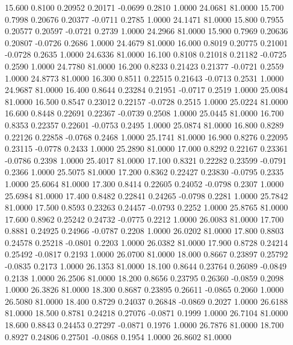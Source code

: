   15.600   0.8100   0.20952   0.20171  -0.0699   0.2810   1.0000  24.0681  81.0000
  15.700   0.7998   0.20676   0.20377  -0.0711   0.2785   1.0000  24.1471  81.0000
  15.800   0.7955   0.20577   0.20597  -0.0721   0.2739   1.0000  24.2966  81.0000
  15.900   0.7969   0.20636   0.20807  -0.0726   0.2686   1.0000  24.4679  81.0000
  16.000   0.8019   0.20775   0.21001  -0.0728   0.2635   1.0000  24.6336  81.0000
  16.100   0.8108   0.21018   0.21182  -0.0725   0.2590   1.0000  24.7780  81.0000
  16.200   0.8233   0.21423   0.21377  -0.0721   0.2559   1.0000  24.8773  81.0000
  16.300   0.8511   0.22515   0.21643  -0.0713   0.2531   1.0000  24.9687  81.0000
  16.400   0.8644   0.23284   0.21951  -0.0717   0.2519   1.0000  25.0084  81.0000
  16.500   0.8547   0.23012   0.22157  -0.0728   0.2515   1.0000  25.0224  81.0000
  16.600   0.8448   0.22691   0.22367  -0.0739   0.2508   1.0000  25.0445  81.0000
  16.700   0.8353   0.22357   0.22601  -0.0753   0.2495   1.0000  25.0874  81.0000
  16.800   0.8289   0.22126   0.22858  -0.0768   0.2468   1.0000  25.1741  81.0000
  16.900   0.8276   0.22095   0.23115  -0.0778   0.2433   1.0000  25.2890  81.0000
  17.000   0.8292   0.22167   0.23361  -0.0786   0.2398   1.0000  25.4017  81.0000
  17.100   0.8321   0.22282   0.23599  -0.0791   0.2366   1.0000  25.5075  81.0000
  17.200   0.8362   0.22427   0.23830  -0.0795   0.2335   1.0000  25.6064  81.0000
  17.300   0.8414   0.22605   0.24052  -0.0798   0.2307   1.0000  25.6984  81.0000
  17.400   0.8482   0.22841   0.24265  -0.0798   0.2281   1.0000  25.7842  81.0000
  17.500   0.8593   0.23263   0.24457  -0.0793   0.2252   1.0000  25.8765  81.0000
  17.600   0.8962   0.25242   0.24732  -0.0775   0.2212   1.0000  26.0083  81.0000
  17.700   0.8881   0.24925   0.24966  -0.0787   0.2208   1.0000  26.0202  81.0000
  17.800   0.8803   0.24578   0.25218  -0.0801   0.2203   1.0000  26.0382  81.0000
  17.900   0.8728   0.24214   0.25492  -0.0817   0.2193   1.0000  26.0700  81.0000
  18.000   0.8667   0.23897   0.25792  -0.0835   0.2173   1.0000  26.1353  81.0000
  18.100   0.8644   0.23764   0.26089  -0.0849   0.2138   1.0000  26.2506  81.0000
  18.200   0.8656   0.23795   0.26360  -0.0859   0.2098   1.0000  26.3826  81.0000
  18.300   0.8687   0.23895   0.26611  -0.0865   0.2060   1.0000  26.5080  81.0000
  18.400   0.8729   0.24037   0.26848  -0.0869   0.2027   1.0000  26.6188  81.0000
  18.500   0.8781   0.24218   0.27076  -0.0871   0.1999   1.0000  26.7104  81.0000
  18.600   0.8843   0.24453   0.27297  -0.0871   0.1976   1.0000  26.7876  81.0000
  18.700   0.8927   0.24806   0.27501  -0.0868   0.1954   1.0000  26.8602  81.0000
